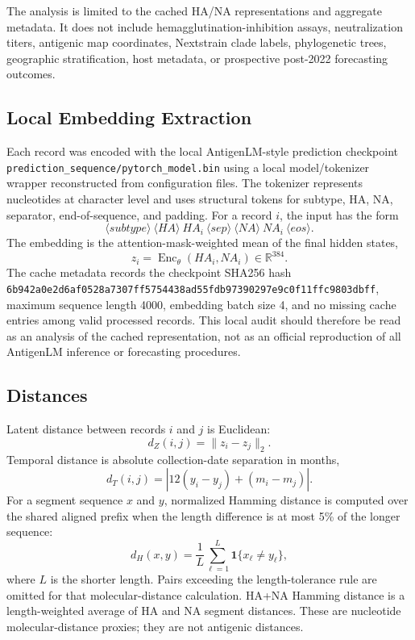 \documentclass[11pt]{article}
\newcommand{\Enc}{\operatorname{Enc}}
\newcommand{\R}{\mathbb{R}}
\begin{document}
The analysis is limited to the cached HA/NA representations and aggregate metadata. It does not include hemagglutination-inhibition assays, neutralization titers, antigenic map coordinates, Nextstrain clade labels, phylogenetic trees, geographic stratification, host metadata, or prospective post-2022 forecasting outcomes.

\subsection{Local Embedding Extraction}

Each record was encoded with the local AntigenLM-style prediction checkpoint \texttt{prediction\_sequence/pytorch\_model.bin} using a local model/tokenizer wrapper reconstructed from configuration files. The tokenizer represents nucleotides at character level and uses structural tokens for subtype, HA, NA, separator, end-of-sequence, and padding. For a record $i$, the input has the form
\[
\langle subtype\rangle \ \langle HA\rangle \ HA_i \ \langle sep\rangle \ \langle NA\rangle \ NA_i \ \langle eos\rangle .
\]
The embedding is the attention-mask-weighted mean of the final hidden states,
\[
z_i=\Enc_{\theta}(HA_i,NA_i)\in\R^{384}.
\]
The cache metadata records the checkpoint SHA256 hash
\texttt{6b942a0e2d6af0528a7307ff5754438ad55fdb97390297e9c0f11ffc9803dbff}, maximum sequence length 4000, embedding batch size 4, and no missing cache entries among valid processed records. This local audit should therefore be read as an analysis of the cached representation, not as an official reproduction of all AntigenLM inference or forecasting procedures.

\subsection{Distances}

Latent distance between records $i$ and $j$ is Euclidean:
\[
d_Z(i,j)=\lVert z_i-z_j\rVert_2.
\]
Temporal distance is absolute collection-date separation in months,
\[
d_T(i,j)=\left|12(y_i-y_j)+(m_i-m_j)\right|.
\]
For a segment sequence $x$ and $y$, normalized Hamming distance is computed over the shared aligned prefix when the length difference is at most 5\% of the longer sequence:
\[
d_H(x,y)=\frac{1}{L}\sum_{\ell=1}^{L}\mathbf{1}\{x_\ell\neq y_\ell\},
\]
where $L$ is the shorter length. Pairs exceeding the length-tolerance rule are omitted for that molecular-distance calculation. HA+NA Hamming distance is a length-weighted average of HA and NA segment distances. These are nucleotide molecular-distance proxies; they are not antigenic distances.
\end{document}
